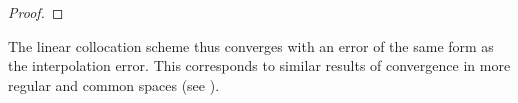 \documentclass[12pt,a4paper]{article}
\begin{document}
\begin{proof}
\end{proof}
The linear collocation scheme thus converges with an error of the same form as the interpolation error. This corresponds to similar results of convergence in more regular and common spaces (see \cite{okrasinska2025functional}).
\end{document}
